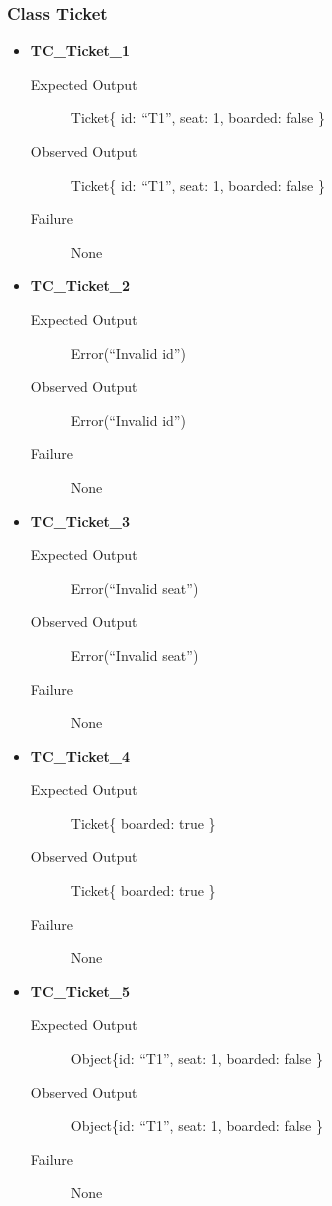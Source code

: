 \documentclass[11pt]{article}
\begin{document}
\subsubsection{Class Ticket}
\label{sec:org9dfea45}

\begin{itemize}
\item \textbf{TC\_Ticket\_1}
\begin{description}
\item[{Expected Output}] Ticket\{ id: “T1”, seat: 1, boarded: false \}
\item[{Observed Output}] Ticket\{ id: “T1”, seat: 1, boarded: false \}
\item[{Failure}] None
\end{description}

\item \textbf{TC\_Ticket\_2}
\begin{description}
\item[{Expected Output}] Error(“Invalid id”)
\item[{Observed Output}] Error(“Invalid id”)
\item[{Failure}] None
\end{description}

\item \textbf{TC\_Ticket\_3}
\begin{description}
\item[{Expected Output}] Error(“Invalid seat”)
\item[{Observed Output}] Error(“Invalid seat”)
\item[{Failure}] None
\end{description}

\item \textbf{TC\_Ticket\_4}
\begin{description}
\item[{Expected Output}] Ticket\{ boarded: true \}
\item[{Observed Output}] Ticket\{ boarded: true \}
\item[{Failure}] None
\end{description}

\item \textbf{TC\_Ticket\_5}
\begin{description}
\item[{Expected Output}] Object\{id: “T1”, seat: 1, boarded: false \}
\item[{Observed Output}] Object\{id: “T1”, seat: 1, boarded: false \}
\item[{Failure}] None
\end{description}


\end{itemize}
\end{document}
